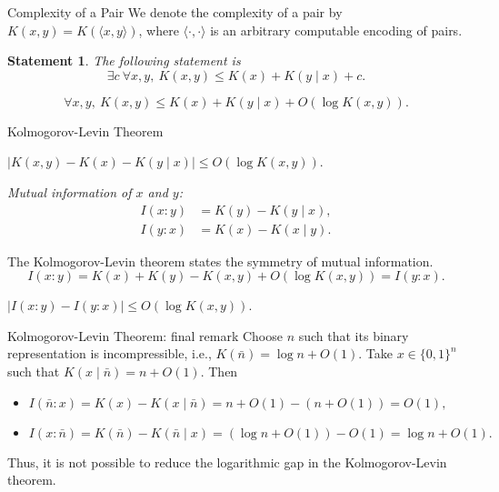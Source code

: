 \documentclass[aspectratio=169]{beamer}
\newtheorem{statement}{Statement}
\begin{document}
\begin{frame}{Complexity of a Pair}
We denote the complexity of a pair by $K(x,y) = K(\langle x,y\rangle)$, where $\langle\cdot,\cdot\rangle$ is an arbitrary computable encoding of pairs.

\begin{statement}
    The following statement is 
    \[
    \exists c\ \forall x,y,\ K(x,y) \le K(x) + K(y \mid x) + c.
    \]
\end{statement}\vspace{-5mm}

\pause\pause

\begin{theorem}
    \[
    \forall x,y,\ K(x,y) \le K(x) + K(y \mid x) + O(\log K(x,y)).
    \]
\end{theorem}

\end{frame}


\begin{frame}{Kolmogorov-Levin Theorem}
\begin{theorem}\label{thm:kolmogorov-levin}
    $|K(x,y) - K(x) - K(y \mid x)| \le O(\log K(x,y))$.
\end{theorem}

\begin{definition}
    \emph{Mutual information of $x$ and $y$:}
    \[
    \begin{aligned}
        I(x:y) &= K(y) - K(y \mid x),\\
        I(y:x) &= K(x) - K(x \mid y).
    \end{aligned}
    \]
\end{definition}

The Kolmogorov-Levin theorem states the symmetry of mutual information.
\[
I(x:y) = K(x) + K(y) - K(x,y) + O(\log K(x,y)) = I(y:x).
\]
\vspace{-5mm}
\begin{corollary}
    $|I(x:y) - I(y:x)| \le O(\log K(x,y))$.
\end{corollary}
\end{frame}

\begin{frame}{Kolmogorov-Levin Theorem: final remark}
    Choose $n$ such that its binary representation is incompressible, i.e., $K(\bar n) = \log n + O(1)$. Take $x \in \{0,1\}^n$ such that $K(x \mid \bar n) = n + O(1)$. Then
\begin{itemize}
    \item\(
    I(\bar n : x) = K(x) - K(x \mid \bar n) = n + O(1) - (n + O(1)) = O(1),
    \)
    \item\(
    I(x : \bar n) = K(\bar n) - K(\bar n \mid x) = (\log n + O(1)) - O(1) = \log n + O(1).
    \)
\end{itemize}
Thus, it is not possible to reduce the logarithmic gap in the Kolmogorov-Levin theorem.
\end{frame}
\end{document}
